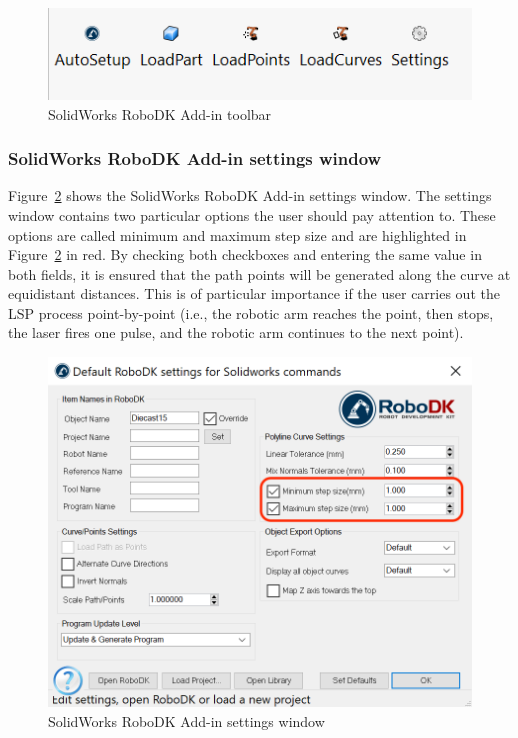 \begin{figure}[h]
    \centering
    \includegraphics[width=0.6\linewidth]{img/solidworks_toolbar.PNG}
    \caption{SolidWorks RoboDK Add-in toolbar}
    \label{fig:solidworkstoolbar}
\end{figure}


\subsubsection*{SolidWorks RoboDK Add-in settings window}

Figure~\ref{fig:solidworkssettings} shows the SolidWorks RoboDK Add-in settings window. The settings window contains two particular options the user should pay attention to. These options are called minimum and maximum step size and are highlighted in Figure~\ref{fig:solidworkssettings} in red. By checking both checkboxes and entering the same value in both fields, it is ensured that the path points will be generated along the curve at equidistant distances. This is of particular importance if the user carries out the LSP process  point-by-point (i.e., the robotic arm reaches the point, then stops, the laser fires one pulse, and the robotic arm continues to the next point).


\begin{figure}[h]
    \centering
    \includegraphics[width=1.0\linewidth]{img/settings_add_in_v_2.png}
    \caption{SolidWorks RoboDK Add-in settings window}
    \label{fig:solidworkssettings}
\end{figure}






